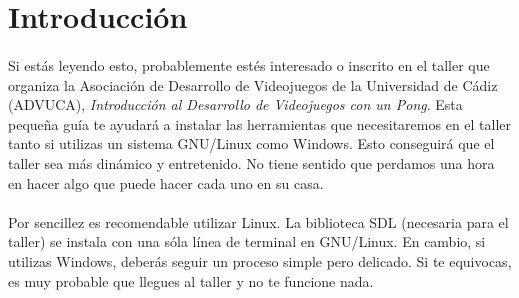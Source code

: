 \documentclass[16pt,spanish]{article}
\title{\titlename}
\author{\authorname}
\def \plpath{.}
\begin{document}









\section{Introducción}
\label{sec:intro}

\paragraph{}
Si estás leyendo esto, probablemente estés interesado o inscrito
en el taller que organiza la Asociación de Desarrollo de Videojuegos
de la Universidad de Cádiz (ADVUCA), \emph{Introducción al Desarrollo
de Videojuegos con un Pong}. Esta pequeña guía te ayudará a instalar
las herramientas que necesitaremos en el taller tanto si utilizas
un sistema GNU/Linux como Windows. Esto conseguirá que el taller sea
más dinámico y entretenido. No tiene sentido que perdamos una hora
en hacer algo que puede hacer cada uno en su casa.

\paragraph{}
Por sencillez es recomendable utilizar Linux. La biblioteca SDL (necesaria
para el taller) se instala con una sóla línea de terminal en GNU/Linux.
En cambio, si utilizas Windows, deberás seguir un proceso simple pero delicado.
Si te equivocas, es muy probable que llegues al taller y no te funcione nada.
\end{document}
